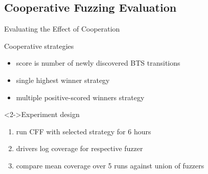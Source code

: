 \documentclass[\HandoutMode,table]{beamer}
\begin{document}
\subsection{Cooperative Fuzzing Evaluation}

\begin{frame}
    {Evaluating the Effect of Cooperation}
    \begin{block}{Cooperative strategies}
        \begin{itemize}
            \item{} score is number of newly discovered BTS transitions
            \item{} single highest winner strategy
            \item{} multiple positive-scored winners strategy
        \end{itemize}
    \end{block}
    \begin{block}<2->{Experiment design}
        \begin{enumerate}
            \item{} run CFF with selected strategy for 6 hours
            \item{} drivers log coverage for respective fuzzer
            \item{} compare mean coverage over 5 runs against union of fuzzers
        \end{enumerate}
    \end{block}
\end{frame}
\end{document}
